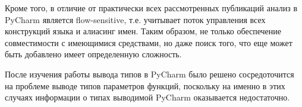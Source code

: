Кроме того, в отличие от практически всех рассмотренных публикаций анализ в PyCharm
является flow-sensitive, т.е. учитывает поток управления всех конструкций языка
и алиасинг имен. Таким образом, не только обеспечение совместимости с имеющимися
средствами, но даже поиск того, что еще может быть добавлено имеет
определенную сложность. 

После изучения работы вывода типов в PyCharm было решено сосредоточится на
проблеме выводе типов параметров функций, поскольку на именно в этих случаях
информации о типах выводимой PyCharm оказывается недостаточно.

